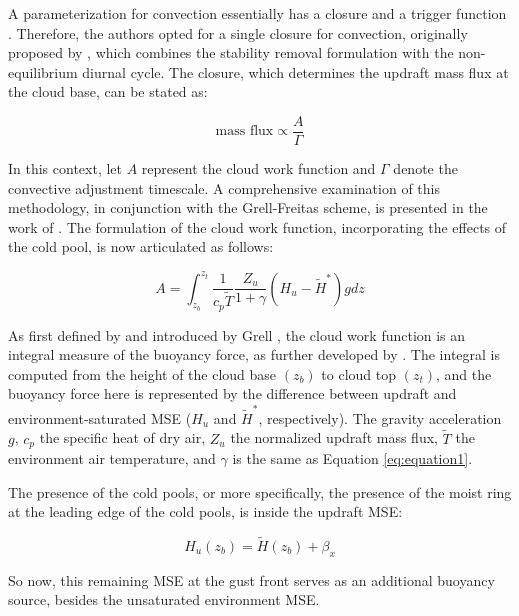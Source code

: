 A parameterization for convection essentially has a closure and a trigger function \cite{emanuel1994atmospheric}. Therefore, the authors opted for a single closure for convection, originally proposed by , which combines the stability removal formulation with the non-equilibrium diurnal cycle. The closure, which determines the updraft mass flux at the cloud base, can be stated as:

\begin{equation}
	\text{mass flux} \propto \frac{A}{\Gamma}
\end{equation}

In this context, let $A$ represent the cloud work function and $\Gamma$ denote the convective adjustment timescale. A comprehensive examination of this methodology, in conjunction with the Grell-Freitas scheme, is presented in the work of . The formulation of the cloud work function, incorporating the effects of the cold pool, is now articulated as follows:

\begin{equation}
    A = \int_{z_b}^{z_t} \frac{1}{{c_p}\tilde T} \frac{Z_u}{1 + \gamma} (H_u - \tilde H^*) gdz
\end{equation}

As first defined by  and introduced by Grell , the cloud work function is an integral measure of the buoyancy force, as further developed by . The integral is computed from the height of the cloud base $(z_b)$ to cloud top $(z_t)$, and the buoyancy force here is represented by the difference between updraft and environment-saturated MSE ($H_u$ and $\tilde H^*$, respectively). The gravity acceleration $g$, $c_p$ the specific heat of dry air, $Z_u$ the normalized updraft mass flux, $\tilde T$ the environment air temperature, and $\gamma$ is the same as Equation \ref{eq:equation1}. 

The presence of the cold pools, or more specifically, the presence of the moist ring at the leading edge of the cold pools, is inside the updraft MSE:

\begin{equation}
	{H_u}(z_b) = \tilde H(z_b) + \beta_x
\end{equation}

So now, this remaining MSE at the gust front serves as an additional buoyancy source, besides the unsaturated environment MSE.

